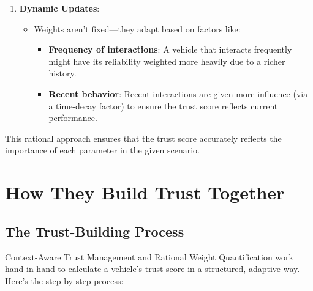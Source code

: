 \documentclass{article}
\begin{document}
\begin{enumerate}
    \item \textbf{Dynamic Updates}:
    \begin{itemize}
        \item Weights aren’t fixed—they adapt based on factors like:
        \begin{itemize}
            \item \textbf{Frequency of interactions}: A vehicle that interacts frequently might have its reliability weighted more heavily due to a richer history.
            \item \textbf{Recent behavior}: Recent interactions are given more influence (via a time-decay factor) to ensure the trust score reflects current performance.
        \end{itemize}
    \end{itemize}
\end{enumerate}

This rational approach ensures that the trust score accurately reflects the importance of each parameter in the given scenario.

\section*{How They Build Trust Together}

\subsection*{The Trust-Building Process}
Context-Aware Trust Management and Rational Weight Quantification work hand-in-hand to calculate a vehicle’s trust score in a structured, adaptive way. Here’s the step-by-step process:
\end{document}
